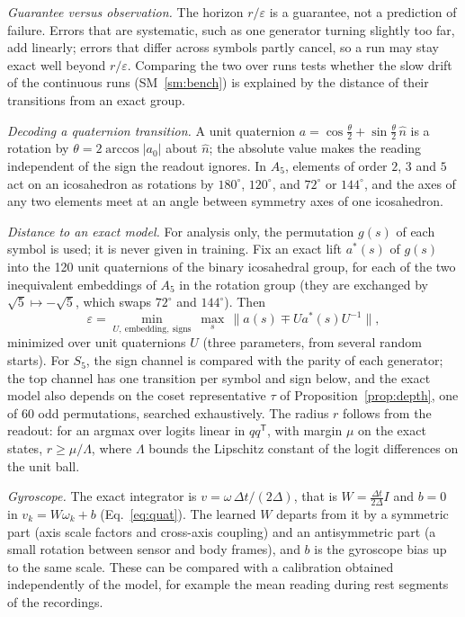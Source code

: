 \documentclass[aps,prx,reprint,superscriptaddress,longbibliography,nofootinbib,floatfix]{revtex4-2}
\theoremstyle{plain}
\theoremstyle{definition}
\begin{document}
\emph{Guarantee versus observation.} The horizon $r/\varepsilon$ is a
guarantee, not a prediction of failure. Errors that are systematic, such as
one generator turning slightly too far, add linearly; errors that differ
across symbols partly cancel, so a run may stay exact well beyond
$r/\varepsilon$. Comparing the two over runs tests whether the slow drift
of the continuous runs (SM~\ref{sm:bench}) is explained by the distance of
their transitions from an exact group.

\emph{Decoding a quaternion transition.} A unit quaternion
$a=\cos\tfrac\theta2+\sin\tfrac\theta2\,\hat n$ is a rotation by
$\theta=2\arccos|a_0|$ about $\hat n$; the absolute value makes the reading
independent of the sign the readout ignores. In $A_5$, elements of order
$2$, $3$ and $5$ act on an icosahedron as rotations by $180^\circ$,
$120^\circ$, and $72^\circ$ or $144^\circ$, and the axes of any two elements
meet at an angle between symmetry axes of one icosahedron.

\emph{Distance to an exact model.} For analysis only, the permutation
$g(s)$ of each symbol is used; it is never given in training. Fix an exact
lift $a^*(s)$ of $g(s)$ into the 120 unit quaternions of the binary
icosahedral group, for each of the two inequivalent embeddings of $A_5$ in
the rotation group (they are exchanged by $\sqrt5\mapsto-\sqrt5$, which
swaps $72^\circ$ and $144^\circ$). Then
\begin{equation}
\varepsilon=\min_{U,\ \text{embedding},\ \text{signs}}\ \max_s\,
\bigl\|a(s)\mp U a^*(s)U^{-1}\bigr\|,
\label{eq:eps}
\end{equation}
minimized over unit quaternions $U$ (three parameters, from several random
starts). For $S_5$, the sign channel is compared with the parity of each
generator; the top channel has one transition per symbol and sign below,
and the exact model also depends on the coset representative $\tau$ of
Proposition~\ref{prop:depth}, one of 60 odd permutations, searched
exhaustively. The radius $r$ follows from the readout: for an argmax over
logits linear in $qq^{\mathsf T}$, with margin $\mu$ on the exact states,
$r\ge\mu/\Lambda$, where $\Lambda$ bounds the Lipschitz constant of the
logit differences on the unit ball.

\emph{Gyroscope.} The exact integrator is $v=\omega\,\Delta t/(2\Delta)$,
that is $W=\tfrac{\Delta t}{2\Delta}I$ and $b=0$ in $v_k=W\omega_k+b$ (Eq.~\eqref{eq:quat}).
The learned $W$ departs from it by a symmetric part (axis scale factors and
cross-axis coupling) and an antisymmetric part (a small rotation between
sensor and body frames), and $b$ is the gyroscope bias up to the same
scale. These can be compared with a calibration obtained independently of
the model, for example the mean reading during rest segments of the
recordings.
\end{document}
